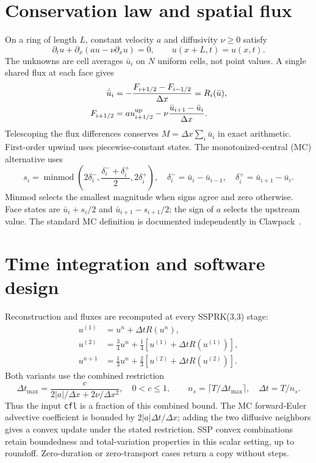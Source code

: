 \documentclass[10pt,a4paper]{article}
\begin{document}
\section{Conservation law and spatial flux}
On a ring of length $L$, constant velocity $a$ and diffusivity $\nu\ge0$ satisfy
\begin{equation}
\partial_tu+\partial_x(au-\nu\partial_xu)=0,\qquad u(x+L,t)=u(x,t).
\end{equation}
The unknowns are cell averages $\bar u_i$ on $N$ uniform cells, not point values. A single shared flux at each face gives
\begin{align}
\dot{\bar u}_i&=-\frac{F_{i+1/2}-F_{i-1/2}}{\Delta x}=R_i(\bar u),\\
F_{i+1/2}&=a u^{\rm up}_{i+1/2}-\nu\frac{\bar u_{i+1}-\bar u_i}{\Delta x}.
\end{align}
Telescoping the flux differences conserves $M=\Delta x\sum_i\bar u_i$ in exact arithmetic. First-order upwind uses piecewise-constant states. The monotonized-central (MC) alternative uses
\begin{equation}
s_i=\operatorname{minmod}\!\left(2\delta_i^-,\frac{\delta_i^-+\delta_i^+}{2},2\delta_i^+\right),
\quad\delta_i^-=\bar u_i-\bar u_{i-1},\quad\delta_i^+=\bar u_{i+1}-\bar u_i.
\end{equation}
Minmod selects the smallest magnitude when signs agree and zero otherwise. Face states are $\bar u_i+s_i/2$ and $\bar u_{i+1}-s_{i+1}/2$; the sign of $a$ selects the upstream value. The standard MC definition is documented independently in Clawpack~\cite{mc}.
\newpage
\section{Time integration and software design}
Reconstruction and fluxes are recomputed at every SSPRK(3,3) stage:
\begin{align}
u^{(1)}&=u^n+\Delta t R(u^n),\\
u^{(2)}&=\tfrac34u^n+\tfrac14[u^{(1)}+\Delta tR(u^{(1)})],\\
u^{n+1}&=\tfrac13u^n+\tfrac23[u^{(2)}+\Delta tR(u^{(2)})].
\end{align}
Both variants use the combined restriction
\begin{equation}
\Delta t_{\max}=\frac{c}{2|a|/\Delta x+2\nu/\Delta x^2},\quad 0<c\le1,
\qquad n_s=\lceil T/\Delta t_{\max}\rceil,\quad\Delta t=T/n_s.
\end{equation}
Thus the input \texttt{cfl} is a fraction of this combined bound. The MC forward-Euler advective coefficient is bounded by $2|a|\Delta t/\Delta x$; adding the two diffusive neighbors gives a convex update under the stated restriction. SSP convex combinations retain boundedness and total-variation properties in this scalar setting, up to roundoff. Zero-duration or zero-transport cases return a copy without steps.
\end{document}
